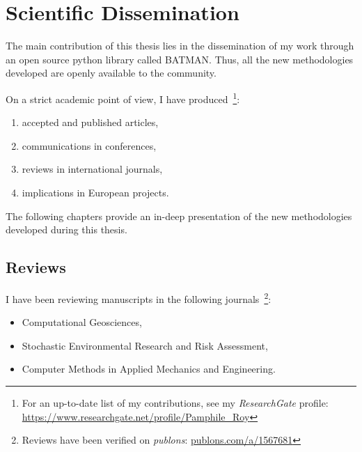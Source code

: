 \chapter{Scientific Dissemination}

The main contribution of this thesis lies in the dissemination of my work through an open source python library called BATMAN. Thus, all the new methodologies developed are openly available to the community.

On a strict academic point of view, I have produced~{\color[rgb]{0.9,0.2,0.16}\footnote{For an up-to-date list of my contributions, see my \emph{ResearchGate} profile: \href{https://www.researchgate.net/profile/Pamphile\_Roy}{https://www.researchgate.net/profile/Pamphile\_Roy}}}:

\begin{enumerate}
\item[\textbf{7}] accepted and published articles,
\item[\textbf{6}] communications in conferences,
\item[\textbf{3}] reviews in international journals,
\item[\textbf{2}] implications in European projects.
\end{enumerate}

The following chapters provide an in-deep presentation of the new methodologies developed during this thesis.

{}

{}

\section*{Reviews}

I have been reviewing manuscripts in the following journals~{\color[rgb]{0.9,0.2,0.16}\footnote{Reviews have been verified on \emph{publons}: \href{https://publons.com/a/1567681}{publons.com/a/1567681}}}:

\begin{itemize}
\item Computational Geosciences,
\item Stochastic Environmental Research and Risk Assessment,
\item Computer Methods in Applied Mechanics and Engineering.
\end{itemize}

